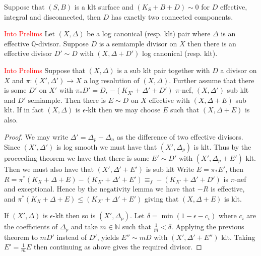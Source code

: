 \documentclass[a4paper,12pt]{book}
\newcommand\myworries[1]{\textcolor{red}{#1}}
\begin{document}
\begin{lemma}\label{cc} \cite[Proposition 4.37]{kk-singbook}
	Suppose that $(S,B)$ is a klt surface and $(K_{S}+B+D) \sim 0$ for $D$ effective, integral and disconnected, then $D$ has exactly two connected components.
\end{lemma}


\begin{theorem}\cite[Theorem 1]{tanaka2017semiample}\myworries{Into Prelims}
	Let $(X,\Delta)$ be a log canonical (resp. klt) pair where $\Delta$ is an effective $\mathbb{Q}$-divisor. Suppose $D$ is a semiample divisor on $X$ then there is an effective divisor $D'\sim D$ with $(X,\Delta+D')$ log canonical (resp. klt).
\end{theorem}

\begin{corollary}\label{average}\myworries{Into Prelims}
	Suppose that $(X,\Delta)$ is a sub klt pair together with $D$ a divisor on $X$ and $\pi\colon (X',\Delta') \to X$ a log resolution of $(X,\Delta)$. Further assume that there is some $D'$ on $X'$ with $\pi_{*}D'=D$, $-(K_{X'}+\Delta'+D')$ $\pi$-nef, $(X,\Delta')$ sub klt and $D'$ semiample. Then there is $E \sim D$ on $X$ effective with $(X,\Delta+E)$ sub klt. If in fact $(X,\Delta)$ is $\epsilon$-klt then we may choose $E$ such that $(X,\Delta+E)$ is also.
\end{corollary}
\begin{proof}
	We may write $\Delta'=\Delta_{p}-\Delta_{n}$ as the difference of two effective divisors. Since $(X',\Delta')$ is log smooth we must have that $(X',\Delta_{p})$ is klt. Thus by the proceeding theorem we have that there is some $E' \sim D'$ with $(X',\Delta_{p}+E')$ klt. Then we must also have that $(X',\Delta'+E')$ is sub klt 
	Write $E=\pi_{*}E'$, then $R=\pi^{*}(K_{X}+\Delta+E)- (K_{X'}+\Delta'+E')\equiv_{f}-(K_{X'}+\Delta'+D')$ is $\pi$-nef and exceptional. Hence by the negativity lemma we have that $-R$ is effective, and $\pi^{*}(K_{X}+\Delta+E) \leq (K_{X'}+\Delta'+E')$ giving that $(X,\Delta +E)$ is klt.
	
	If $(X',\Delta)$ is $\epsilon$-klt then so is $(X',\Delta_{p})$. Let $\delta =\min (1-\epsilon-c_{i})$ where $c_{i}$ are the coefficients of $\Delta_{p}$ and take $m \in \mathbb{N}$ such that $\frac{1}{m} < \delta$. Applying the previous theorem to $mD'$ instead of $D'$, yields $E'' \sim mD$ with $(X',\Delta'+E'')$ klt. Taking $E'=\frac{1}{m}E$ then continuing as above gives the required divisor. 
\end{proof}
\end{document}
